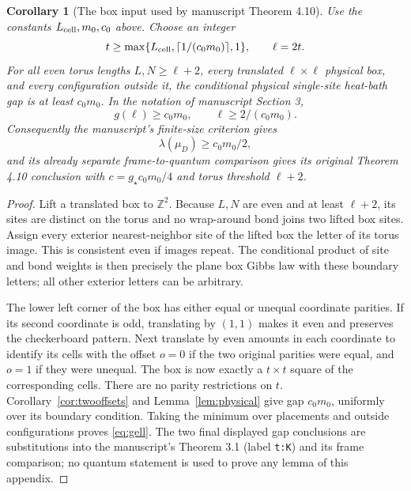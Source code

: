 \documentclass[11pt]{amsart}
\newtheorem{corollary}[theorem]{Corollary}
\theoremstyle{definition}
\newcommand{\Z}{\mathbb Z}
\newcommand{\1}{\mathbf 1}
\begin{document}
\begin{corollary}[The box input used by manuscript Theorem 4.10]
\label{cor:boxinput}
Use the constants $L_{\rm cell},m_0,c_0$ above. Choose an integer
\begin{equation}\label{eq:chooseell}
 t\ge\max\{L_{\rm cell},\lceil1/(c_0m_0)\rceil,1\},
 \qquad \ell=2t.
\end{equation}
For all even torus lengths $L,N\ge\ell+2$, every translated
$\ell\times\ell$ physical box, and every configuration outside it,
the conditional physical single-site heat-bath gap is at least
$c_0m_0$. In the notation of manuscript Section 3,
\begin{equation}\label{eq:gell}
 g(\ell)\ge c_0m_0,\qquad \ell\ge2/(c_0m_0).
\end{equation}
Consequently the manuscript's finite-size criterion gives
\[
 \lambda(\mu_D)\ge c_0m_0/2,
\]
and its already separate frame-to-quantum comparison gives its original
Theorem 4.10 conclusion with
$c=g_\star c_0m_0/4$ and torus threshold $\ell+2$.
\end{corollary}
\begin{proof}
Lift a translated box to $\Z^2$. Because $L,N$ are even and at least
$\ell+2$, its sites are distinct on the torus and no wrap-around bond
joins two lifted box sites. Assign every exterior nearest-neighbor site
of the lifted box the letter of its torus image. This is consistent even
if images repeat. The conditional product of site and bond weights is
then precisely the plane box Gibbs law with these boundary letters;
all other exterior letters can be arbitrary.

The lower left corner of the box has either equal or unequal coordinate
parities. If its second coordinate is odd, translating by $(1,1)$ makes
it even and preserves the checkerboard pattern. Next translate by even
amounts in each coordinate to identify its cells with the offset $o=0$
if the two original parities were equal, and $o=1$ if they were unequal.
The box is now exactly a $t\times t$ square of the corresponding cells.
There are no parity restrictions on $t$.
Corollary~\ref{cor:twooffsets} and Lemma~\ref{lem:physical} give gap
$c_0m_0$, uniformly over its boundary condition. Taking the minimum over
placements and outside configurations proves \eqref{eq:gell}.
The two final displayed gap conclusions are substitutions into the
manuscript's Theorem 3.1 (label \texttt{t:K}) and its frame comparison;
no quantum statement is used to prove any lemma of this appendix.
\end{proof}
\end{document}

